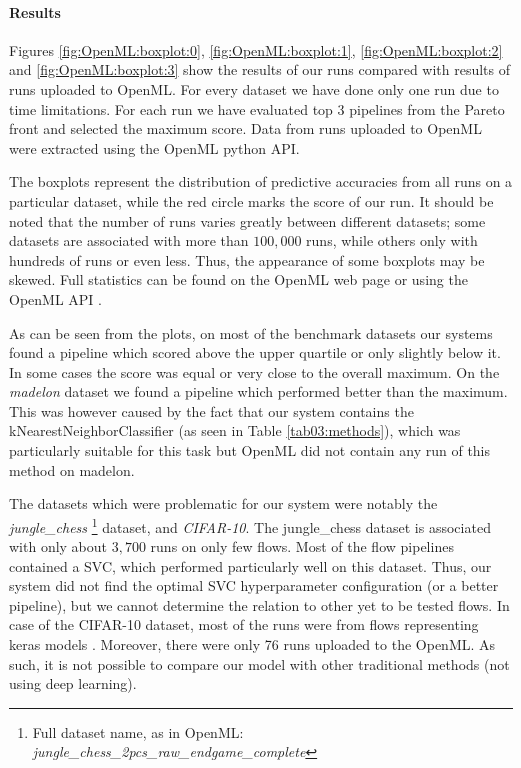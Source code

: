 \paragraph{Results}
Figures \ref{fig:OpenML:boxplot:0}, \ref{fig:OpenML:boxplot:1},
\ref{fig:OpenML:boxplot:2} and \ref{fig:OpenML:boxplot:3} show the results
of our runs compared with results of runs uploaded to OpenML. For every dataset
we have done only one run due to time limitations. For each run we have
evaluated top 3 pipelines from the Pareto front and selected the maximum score.
Data from runs uploaded to OpenML were extracted using the OpenML python API.

The boxplots represent the distribution of predictive accuracies from all runs
on a particular dataset, while the red circle marks the score of our run.
It should be noted that the number of runs varies
greatly between different datasets; some datasets are associated with more
than $100,000$ runs, while others only with hundreds of runs or even less. Thus,
the appearance of some boxplots may be skewed. Full statistics can be found on
the OpenML web page or using the OpenML API \citep{openmlcc18, openmlcc18docs}.

As can be seen from the plots, on most of the benchmark datasets our systems
found a pipeline which scored above the upper quartile or only slightly below
it. In some cases the score was equal or very close to the overall maximum. On
the \emph{madelon} dataset we found a pipeline which performed better than the
maximum. This was however caused by the fact that our system contains the
kNearestNeighborClassifier (as seen in Table \ref{tab03:methods}), which was
particularly suitable for this task but OpenML did not contain any run of this
method on madelon.

The datasets which were problematic for our system were notably the
\emph{jungle\_chess} \footnote{Full dataset name, as in OpenML:
\emph{jungle\_chess\_2pcs\_raw\_endgame\_complete}} dataset, 
and \emph{CIFAR-10}. The jungle\_chess dataset is associated with only
about $3,700$ runs on only few flows. Most of the flow pipelines contained a
SVC, which performed particularly well on this dataset. Thus, our system did
not find the optimal SVC hyperparameter configuration (or a better pipeline),
but we cannot determine the relation to other yet to be tested flows.
In case of the CIFAR-10 dataset, most of the runs were from flows representing
keras models \citep{chollet2015keras}. Moreover, there were only 76 runs
uploaded to the OpenML. As such, it is not possible to compare our model with
other traditional methods (not using deep learning).

